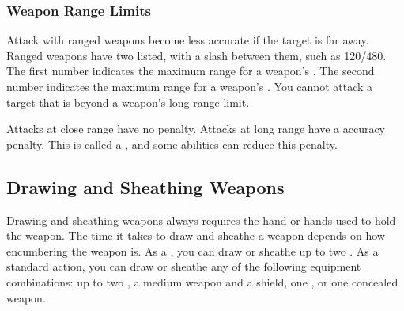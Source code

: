         \subsubsection{Weapon Range Limits}\label{Weapon Range Limits}
            Attack with ranged weapons become less accurate if the target is far away.
            Ranged weapons have two  listed, with a slash between them, such as 120/480.
            The first number indicates the maximum range for a weapon's .
            The second number indicates the maximum range for a weapon's .
            You cannot attack a target that is beyond a weapon's long range limit.

            Attacks at close range have no penalty.
            Attacks at long range have a  accuracy penalty.
            This is called a , and some abilities can reduce this penalty.

    \subsection{Drawing and Sheathing Weapons}\label{Drawing and Sheathing Weapons}
        Drawing and sheathing weapons always requires the hand or hands used to hold the weapon.
        The time it takes to draw and sheathe a weapon depends on how encumbering the weapon is.
        As a , you can draw or sheathe up to two .
        As a standard action, you can draw or sheathe any of the following equipment combinations: up to two , a medium weapon and a shield, one , or one concealed weapon.

